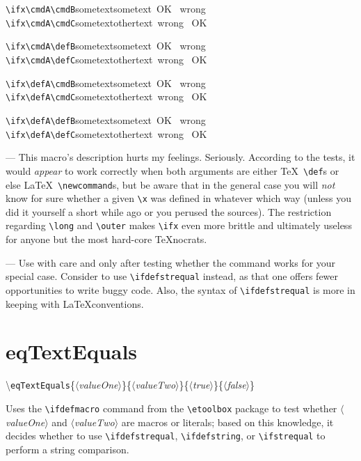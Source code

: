 \documentclass[a5paper,10pt,german]{article}
\newcommand{\fraktur}[1]{\frakturFont #1}
\newenvironment{verdict}{{\fraktur Verdict.}—}{\par}
\newenvironment{advice}{{\fraktur Advice.}—}{\par}
\newcommand{\cmdA}{sometext}
\newcommand{\cmdB}{sometext}
\newcommand{\cmdC}{othertext}
\def\defA{sometext}
\def\defB{sometext}
\def\defC{othertext}
\newcommand{\cmditem}[5]{\textbackslash \texttt{#1}\{\prm{#2}\}\{\prm{#3}\}\{\prm{#4}\}\{\prm{#5}\}}
\newcommand{\prm}[1]{$\langle$\textit{\thinspace #1\thinspace}$\rangle$}
\begin{document}
\verb#\ifx\cmdA\cmdB#\ifx\cmdA\cmdB\ OK    \else\ wrong \fi\\
\verb#\ifx\cmdA\cmdC#\ifx\cmdA\cmdC\ wrong \else\ OK    \fi

\verb#\ifx\cmdA\defB#\ifx\cmdA\defB\ OK    \else\ wrong \fi\\
\verb#\ifx\cmdA\defC#\ifx\cmdA\defC\ wrong \else\ OK    \fi

\verb#\ifx\defA\cmdB#\ifx\defA\cmdB\ OK    \else\ wrong \fi\\
\verb#\ifx\defA\cmdC#\ifx\defA\cmdC\ wrong \else\ OK    \fi

\verb#\ifx\defA\defB#\ifx\defA\defB\ OK    \else\ wrong \fi\\
\verb#\ifx\defA\defC#\ifx\defA\defC\ wrong \else\ OK    \fi


\begin{verdict}
This macro's description hurts my feelings. Seriously. According to the tests, it would {\em appear} to work
correctly when both
arguments are either \TeX\ \verb#\def#s or else \LaTeX\ \verb#\newcommand#s, but be aware that in the
general case you will {\em not} know for sure whether a given \verb#\x# was defined in whatever which way
(unless you did it yourself a short while ago or you perused the sources). The restriction regarding
\verb#\long# and \verb#\outer# makes \verb#\ifx# even more brittle and ultimately useless for anyone
but the most hard-core \TeX nocrats.
\end{verdict}

\begin{advice}
Use with care and only after testing whether the command works for your special case. Consider to use
\verb#\ifdefstrequal# instead, as that one offers fewer opportunities to write buggy code.
Also, the syntax of \verb#\ifdefstrequal# is more in keeping with \LaTeX conventions.
\end{advice}

\newpage
\section{eqTextEquals}

\cmditem{eqTextEquals}{valueOne}{valueTwo}{true}{false}

\begin{shadequote}{}
Uses the \verb#\ifdefmacro# command from the \verb#\etoolbox# package to test whether \prm{valueOne} and
\prm{valueTwo} are macros or literals; based on this knowledge, it decides whether to use
\verb#\ifdefstrequal#, \verb#\ifdefstring#, or \verb#\ifstrequal# to perform a string comparison.

\end{shadequote}
\end{document}
